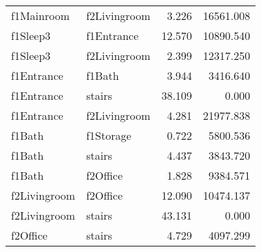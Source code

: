 \begin{tabular}{llrr}
     f1Mainroom &    f2Livingroom &                        3.226 &                    16561.008 \\
       f1Sleep3 &      f1Entrance &                       12.570 &                    10890.540 \\
       f1Sleep3 &    f2Livingroom &                        2.399 &                    12317.250 \\
     f1Entrance &          f1Bath &                        3.944 &                     3416.640 \\
     f1Entrance &          stairs &                       38.109 &                        0.000 \\
     f1Entrance &    f2Livingroom &                        4.281 &                    21977.838 \\
         f1Bath &       f1Storage &                        0.722 &                     5800.536 \\
         f1Bath &          stairs &                        4.437 &                     3843.720 \\
         f1Bath &        f2Office &                        1.828 &                     9384.571 \\
   f2Livingroom &        f2Office &                       12.090 &                    10474.137 \\
   f2Livingroom &          stairs &                       43.131 &                        0.000 \\
       f2Office &          stairs &                        4.729 &                     4097.299 \\
\bottomrule
\end{tabular}

